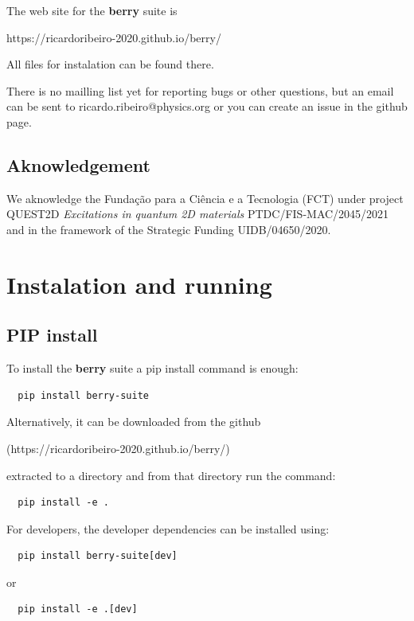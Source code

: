 \documentclass[a4paper,12pt]{report}
\begin{document}
The web site for the \textbf{berry} suite is\medskip

https://ricardoribeiro-2020.github.io/berry/\medskip

All files for instalation can be found there.

There is no mailling list yet for reporting bugs or other questions, but an email can be sent to
ricardo.ribeiro@physics.org or you can create an issue in the github page.

\section{Aknowledgement}

We aknowledge the Fundação para a Ciência e a Tecnologia (FCT)
under project \\ QUEST2D \emph{Excitations in quantum 2D materials}
PTDC/FIS-MAC/2045/2021 \\
and in the framework of the Strategic Funding UIDB/04650/2020.






\chapter{Instalation and running}

\section{PIP install}

To install the \textbf{berry} suite a pip install command is enough:
\begin{verbatim}
  pip install berry-suite
\end{verbatim}

Alternatively, it can be downloaded from the github

(https://ricardoribeiro-2020.github.io/berry/)

extracted to a directory and from that directory run the command:
\begin{verbatim}
  pip install -e .
\end{verbatim}

For developers, the developer dependencies can be installed using:
\begin{verbatim}
  pip install berry-suite[dev]
\end{verbatim}
or
\begin{verbatim}
  pip install -e .[dev]
\end{verbatim}
\end{document}
